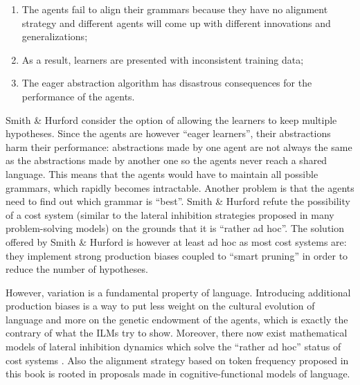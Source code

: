 \begin{enumerate}
\item The agents fail to align their grammars because they have no alignment strategy and different agents will come up with different innovations and generalizations;
\item As a result, learners are presented with inconsistent training data;
\item The eager abstraction algorithm has disastrous consequences for the performance of the agents.
\end{enumerate}

Smith \& Hurford consider the option of allowing the learners to keep multiple hypotheses. Since the agents are however ``eager learners'', their abstractions harm their performance: abstractions made by one agent are not always the same as the abstractions made by another one so the agents never reach a shared language. This means that the agents would have to maintain all possible grammars, which rapidly becomes intractable. Another problem is that the agents need to find out which grammar is ``best''. Smith \& Hurford refute the possibility of a cost system (similar to the lateral inhibition strategies proposed in many problem-solving models) on the grounds that it is ``rather ad hoc''. The solution offered by Smith \& Hurford is however at least ad hoc as most cost systems are: they implement strong production biases coupled to ``smart pruning'' in order to reduce the number of hypotheses.

However, variation is a fundamental property of language. Introducing  additional production biases is a way to put less weight on the cultural evolution of language and more on the genetic endowment of the agents, which is exactly the contrary of what the ILMs try to show. Moreover, there now exist mathematical models of lateral inhibition dynamics which solve the ``rather ad hoc'' status of cost systems \citep{baronchelli06sharp, devylder07evolution}. Also the alignment strategy based on token frequency proposed in this book is rooted in proposals made in cognitive-functional models of language.

